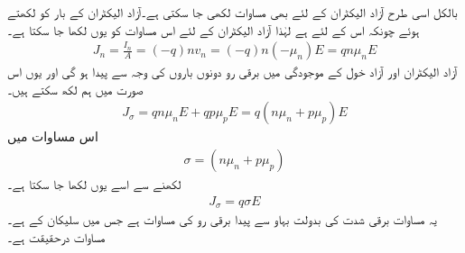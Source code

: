 بالکل اسی طرح آزاد الیکٹران کے لئے بھی مساوات لکھی جا سکتی ہے۔آزاد الیکٹران کے بار کو  لکھتے ہوئے چونکہ اس کے لئے  ہے لہٰذا آزاد الیکٹران کے لئے اس مساوات کو یوں لکھا جا سکتا ہے۔
\begin{align}
J_n = \frac{I_n}{A}=(-q) n v_n = (-q) n (-\mu_n) E = q n \mu_n E
\end{align}
	آزاد الیکٹران اور آزاد خول کے موجودگی میں برقی رو دونوں باروں کی وجہ سے پیدا ہو گی اور یوں اس صورت میں ہم لکھ سکتے ہیں۔
\begin{align}
J_\sigma=q n \mu_n E+ q p \mu_p E=q (n \mu_n+p \mu_p)E
\end{align}
اس مساوات میں  
\begin{align}
\sigma = (n \mu_n+p \mu_p)
\end{align}
لکھنے سے اسے یوں لکھا جا سکتا ہے۔
\begin{align} \label{مساوات_ڈایوڈ_اہم_کا_قانون_الف}
J_\sigma = q \sigma E
\end{align}
یہ مساوات برقی شدت کی بدولت بہاو سے پیدا برقی رو کی مساوات ہے جس میں سلیکان کے   ہے۔مساوات   درحقیقت   ہے۔


